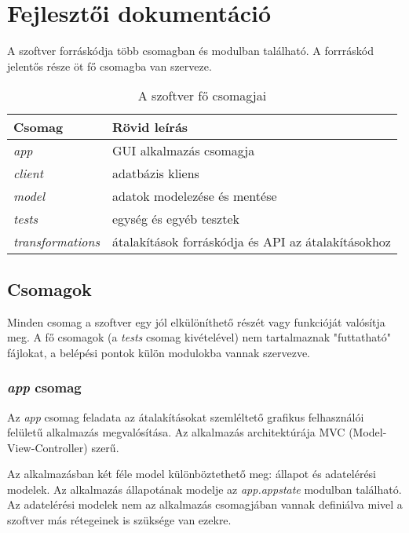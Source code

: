 \chapter{Fejlesztői dokumentáció}
\label{ch:impl}

A szoftver forráskódja több csomagban és modulban található.
A forrráskód jelentős része öt fő csomagba van szerveze.

\begin{table}[H]
	\centering
	\begin{tabular}{ | m{} | m{} | }
		\hline
		\textbf{Csomag} & \textbf{Rövid leírás} \\
		\hline \hline
		\emph{app} & GUI alkalmazás csomagja \\
		\hline
		\emph{client} & adatbázis kliens \\
		\hline
		\emph{model} & adatok modelezése és mentése \\
		\hline
		\emph{tests} & egység és egyéb tesztek \\
		\hline
		\emph{transformations} & átalakítások forráskódja és API az átalakításokhoz \\
		\hline
	\end{tabular}
	\caption{A szoftver fő csomagjai}
	\label{tab:packages}
\end{table}

\section{Csomagok}

Minden csomag a szoftver egy jól elkülöníthető részét vagy funkcióját valósítja meg.
A fő csomagok (a \emph{tests} csomag kivételével) nem tartalmaznak "futtatható" fájlokat,
a belépési pontok külön modulokba vannak szervezve.

\subsection{\emph{app} csomag}

Az \emph{app} csomag feladata az átalakításokat szemléltető grafikus felhasználói
felületű alkalmazás megvalósítása.
Az alkalmazás architektúrája MVC (Model-View-Controller) szerű.

Az alkalmazásban két féle model különböztethető meg: állapot és adatelérési modelek.
Az alkalmazás állapotának modelje az \emph{app.appstate} modulban található.
Az adatelérési modelek nem az alkalmazás csomagjában vannak definiálva mivel 
a szoftver más rétegeinek is szüksége van ezekre.

